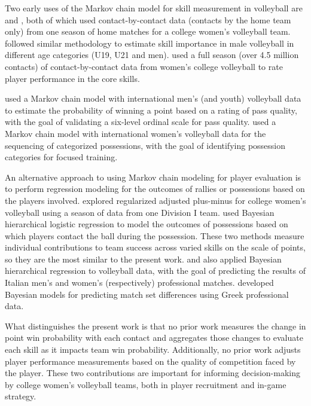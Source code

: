 \documentclass[USenglish]{article}
\theoremstyle{dgthm}
\theoremstyle{dgdef}
\begin{document}
Two early uses of the Markov chain model for skill measurement in volleyball are \textcite{florence_etal_2008} and \textcite{miskin_etal_2010}, both of which used contact-by-contact data (contacts by the home team only) from one season of home matches for a college women's volleyball team. \textcite{drikos_etal_2019} followed similar methodology to estimate skill importance in male volleyball in different age categories (U19, U21 and men). \textcite{bagley_ware_2017} used a full season (over 4.5 million contacts) of contact-by-contact data from women's college volleyball to rate player performance in the core skills.

\textcite{drikos_2018} used a Markov chain model with international men's (and youth) volleyball data to estimate the probability of winning a point based on a rating of pass quality, with the goal of validating a six-level ordinal scale for pass quality. \textcite{hileno_etal_2020} used a Markov chain model with international women's volleyball data for the sequencing of categorized possessions, with the goal of identifying possession categories for focused training.

An alternative approach to using Markov chain modeling for player evaluation is to perform regression modeling for the outcomes of rallies or possessions based on the players involved. \textcite{hass_craig_2018} explored regularized adjusted plus-minus for college women's volleyball using a season of data from one Division I team. \textcite{fellingham_2022} used Bayesian hierarchical logistic regression to model the outcomes of possessions based on which players contact the ball during the possession. These two methods measure individual contributions to team success across varied skills on the scale of points, so they are the most similar to the present work. \textcite{egidi_ntzoufras_2020} and \textcite{gabrio_2021} also applied Bayesian hierarchical regression to volleyball data, with the goal of predicting the results of Italian men's and women's (respectively) professional matches. \textcite{ntzoufras_etal_2021} developed Bayesian models for predicting match set differences using Greek professional data.

What distinguishes the present work is that no prior work measures the change in point win probability with each contact and aggregates those changes to evaluate each skill as it impacts team win probability. Additionally, no prior work adjusts player performance measurements based on the quality of competition faced by the player. These two contributions are important for informing decision-making by college women's volleyball teams, both in player recruitment and in-game strategy.
\end{document}
